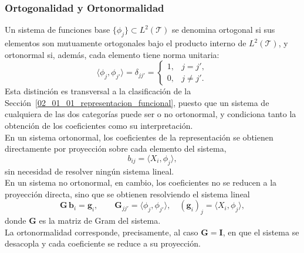 \subsubsection{Ortogonalidad y Ortonormalidad}
\label{02_01_02_01_ortogonalidad_ortonormalidad}
Un sistema de funciones base $\{\phi_j\}\subset L^2(\mathcal{T})$ se denomina ortogonal si sus elementos son mutuamente ortogonales bajo el producto interno de $L^2(\mathcal{T})$, y ortonormal si, además, cada elemento tiene norma unitaria:
\begin{equation}
    \langle \phi_j, \phi_{j'} \rangle = \delta_{jj'} =
    \begin{cases}
        1, & j = j', \\
        0, & j \neq j'.
    \end{cases}
\end{equation}
Esta distinción es transversal a la clasificación de la Sección~\ref{02_01_01_representacion_funcional}, puesto que un sistema de cualquiera de las dos categorías puede ser o no ortonormal, y condiciona tanto la obtención de los coeficientes como su interpretación.\\

En un sistema ortonormal, los coeficientes de la representación se obtienen directamente por proyección sobre cada elemento del sistema,
\begin{equation}
    b_{ij} = \langle X_i, \phi_j \rangle,
\end{equation}
sin necesidad de resolver ningún sistema lineal.\\

En un sistema no ortonormal, en cambio, los coeficientes no se reducen a la proyección directa, sino que se obtienen resolviendo el sistema lineal
\begin{equation}
    \mathbf{G}\,\mathbf{b}_i = \mathbf{g}_i,
    \qquad
    \mathbf{G}_{jj'} = \langle \phi_j, \phi_{j'} \rangle,
    \quad
    (\mathbf{g}_i)_j = \langle X_i, \phi_j \rangle,
\end{equation}
donde $\mathbf{G}$ es la matriz de Gram del sistema.\\

La ortonormalidad corresponde, precisamente, al caso $\mathbf{G} = \mathbf{I}$, en que el sistema se desacopla y cada coeficiente se reduce a su proyección.\\

